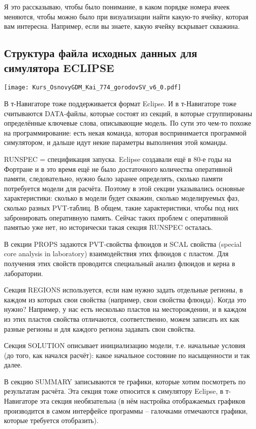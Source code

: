 \documentclass[main.tex]{subfiles}
\begin{document}
Я это рассказываю, чтобы было понимание, в каком порядке номера ячеек меняются, чтобы можно было при визуализации найти какую-то ячейку, которая вам интересна. Например, если вы знаете, какую ячейку вскрывает скважина.

\subsection{Структура файла исходных данных для симулятора ECLIPSE}

\texttt{[image: Kurs\_OsnovyGDM\_Kai\_774\_gorodovSV\_v6\_0.pdf]}

В т-Навигаторе тоже поддерживается формат Eclipse.
И в т-Навигаторе тоже считываются DATA-файлы, которые состоят из секций, в которые сгруппированы определённые ключевые слова, описывающие модель.
По сути это чем-то похоже на программирование: есть некая команда, которая воспринимается программой симулятором, и дальше идут некие параметры выполнения этой команды.

RUNSPEC = спецификация запуска. Eclipse создавали ещё в 80-е годы на Фортране и в это время ещё не было достаточного количества оперативной памяти, следовательно, нужно было заранее определять, сколько памяти потребуется модели для расчёта.
Поэтому в этой секции указывались основные характеристики: сколько в модели будет скважин, сколько моделируемых фаз, сколько разных PVT-таблиц. В общем, такие характеристики, чтобы под них забронировать оперативную память.
Сейчас таких проблем с оперативной памятью уже нет, но исторически такая секция RUNSPEC осталась.

В секции PROPS задаются PVT-свойства флюидов и SCAL свойства (special core analysis in laboratory) взаимодействия этих флюидов с пластом.
Для получения этих свойств проводится специальный анализ флюидов и керна в лаборатории.

Секция REGIONS используется, если нам нужно задать отдельные регионы, в каждом из которых свои свойства (например, свои свойства флюида).
Когда это нужно? Например, у нас есть несколько пластов на месторождении, и в каждом из этих пластов свойства отличаются, соответственно, можем записать их как разные регионы и для каждого региона задавать свои свойства.

Секция SOLUTION описывает инициализацию модели, т.е. начальные условия (до того, как начался расчёт): какое начальное состояние по насыщенности и так далее.

В секцию SUMMARY записываются те графики, которые хотим посмотреть по результатам расчёта.
Эта секция тоже относится к симулятору Eclipse, в т-Навигаторе эта секция необязательна (в нём настройка отображаемых графиков производится в самом интерфейсе программы -- галочками отмечаются графики, которые требуется отобразить).
\end{document}
